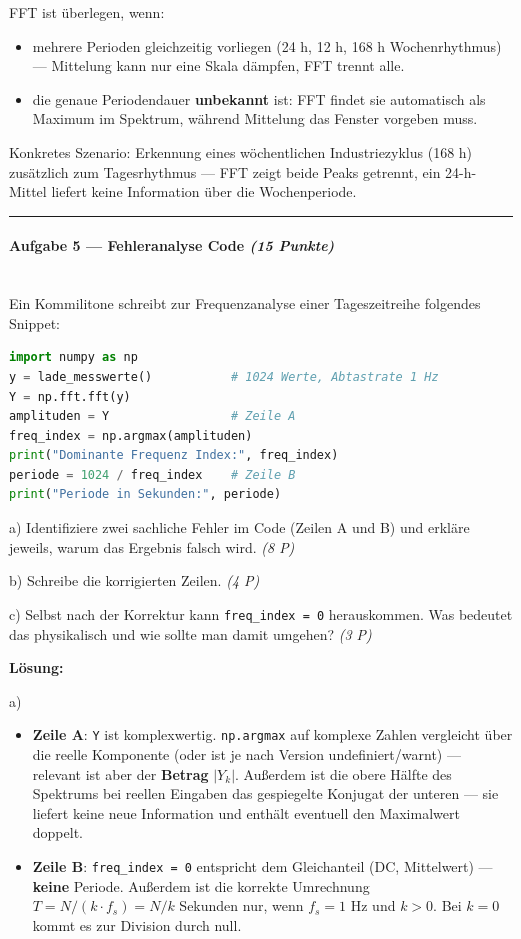 \documentclass[11pt, a4paper]{article}
\begin{document}
FFT ist überlegen, wenn:

\begin{itemize}
  \item mehrere Perioden gleichzeitig vorliegen (24 h, 12 h, 168 h Wochenrhythmus) — Mittelung kann nur eine Skala dämpfen, FFT trennt alle.
  \item die genaue Periodendauer \textbf{unbekannt} ist: FFT findet sie automatisch als Maximum im Spektrum, während Mittelung das Fenster vorgeben muss.
\end{itemize}

Konkretes Szenario: Erkennung eines wöchentlichen Industriezyklus (168 h) zusätzlich zum Tagesrhythmus — FFT zeigt beide Peaks getrennt, ein 24-h-Mittel liefert keine Information über die Wochenperiode.



\noindent\textcolor{rulegray}{\rule{\linewidth}{0.4pt}}


\paragraph{Aufgabe 5 — Fehleranalyse Code \textit{(15 Punkte)}}\mbox{}\\[2pt]

Ein Kommilitone schreibt zur Frequenzanalyse einer Tageszeitreihe folgendes Snippet:


\begin{lstlisting}[language=python]
import numpy as np
y = lade_messwerte()           # 1024 Werte, Abtastrate 1 Hz
Y = np.fft.fft(y)
amplituden = Y                 # Zeile A
freq_index = np.argmax(amplituden)
print("Dominante Frequenz Index:", freq_index)
periode = 1024 / freq_index    # Zeile B
print("Periode in Sekunden:", periode)
\end{lstlisting}


a) Identifiziere zwei sachliche Fehler im Code (Zeilen A und B) und erkläre jeweils, warum das Ergebnis falsch wird. \textit{(8 P)}


b) Schreibe die korrigierten Zeilen. \textit{(4 P)}


c) Selbst nach der Korrektur kann \texttt{freq\_index = 0} herauskommen. Was bedeutet das physikalisch und wie sollte man damit umgehen? \textit{(3 P)}


\textbf{Lösung:}


a)

\begin{itemize}
  \item \textbf{Zeile A}: \texttt{Y} ist komplexwertig. \texttt{np.argmax} auf komplexe Zahlen vergleicht über die reelle Komponente (oder ist je nach Version undefiniert/warnt) — relevant ist aber der \textbf{Betrag} $|Y_k|$. Außerdem ist die obere Hälfte des Spektrums bei reellen Eingaben das gespiegelte Konjugat der unteren — sie liefert keine neue Information und enthält eventuell den Maximalwert doppelt.
  \item \textbf{Zeile B}: \texttt{freq\_index = 0} entspricht dem Gleichanteil (DC, Mittelwert) — \textbf{keine} Periode. Außerdem ist die korrekte Umrechnung $T = N/(k\cdot f_s) = N/k$ Sekunden nur, wenn $f_s = 1$ Hz und $k > 0$. Bei $k=0$ kommt es zur Division durch null.
\end{itemize}
\end{document}
